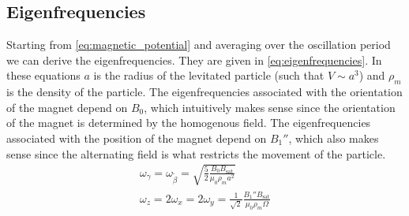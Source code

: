 \subsection{Eigenfrequencies}
\label{subsec:eigenfrequencies}
Starting from \autoref{eq:magnetic_potential} and averaging over the oscillation period we can derive the eigenfrequencies. They are given in \autoref{eq:eigenfrequencies}. In these equations $a$ is the radius of the levitated particle (such that $V \sim a^3$) and $\rho_m$ is the density of the particle. The eigenfrequencies associated with the orientation of the magnet depend on $B_0$, which intuitively makes sense since the orientation of the magnet is determined by the homogenous field. The eigenfrequencies associated with the position of the magnet depend on $B_1''$, which also makes sense since the alternating field is what restricts the movement of the particle.
\begin{equation}
    \begin{gathered}
        \omega_\gamma = \omega_{\tilde\beta} = \sqrt{\frac{5}{2}\frac{B_0B_\text{sat}}{\mu_0 \rho_m a^2}} \\
        \omega_z = 2\omega_x = 2\omega_y = \frac{1}{\sqrt{2}}\frac{B_1''B_\text{sat}}{\mu_0\rho_m\Omega}
    \end{gathered}
    \label{eq:eigenfrequencies}
\end{equation}
